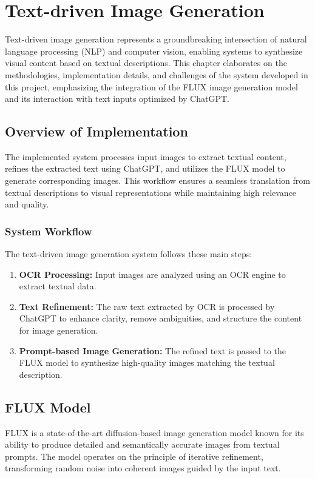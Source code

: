 \chapter{Text-driven Image Generation}

Text-driven image generation represents a groundbreaking intersection of natural language processing (NLP) and computer vision, enabling systems to synthesize visual content based on textual descriptions. This chapter elaborates on the methodologies, implementation details, and challenges of the system developed in this project, emphasizing the integration of the FLUX image generation model and its interaction with text inputs optimized by ChatGPT. 

\section{Overview of Implementation}
The implemented system processes input images to extract textual content, refines the extracted text using ChatGPT, and utilizes the FLUX model to generate corresponding images. This workflow ensures a seamless translation from textual descriptions to visual representations while maintaining high relevance and quality.

\subsection{System Workflow}
The text-driven image generation system follows these main steps:
\begin{enumerate}
    \item \textbf{OCR Processing:} Input images are analyzed using an OCR engine to extract textual data.
    \item \textbf{Text Refinement:} The raw text extracted by OCR is processed by ChatGPT to enhance clarity, remove ambiguities, and structure the content for image generation.
    \item \textbf{Prompt-based Image Generation:} The refined text is passed to the FLUX model to synthesize high-quality images matching the textual description.
\end{enumerate}

\section{FLUX Model}
FLUX is a state-of-the-art diffusion-based image generation model known for its ability to produce detailed and semantically accurate images from textual prompts. The model operates on the principle of iterative refinement, transforming random noise into coherent images guided by the input text.

